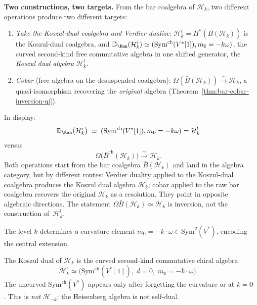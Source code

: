 \medskip
\noindent\textbf{Two constructions, two targets.}
From the bar coalgebra of $\mathcal{H}_k$, two different
operations produce two different targets:
\begin{enumerate}
\item \emph{Take the Koszul-dual coalgebra and Verdier dualize}:
$\mathcal H_k^i=H^*(\bar B(\mathcal H_k))$ is the
Koszul-dual coalgebra, and
$\mathbb{D}_{\Ran}(\mathcal H_k^i)
\simeq (\mathrm{Sym}^{\mathrm{ch}}(V^*[1]),m_0=-k\omega)$,
the curved second-kind free commutative algebra in one shifted
generator, the \emph{Koszul dual algebra} $\mathcal{H}_k^!$.
\item \emph{Cobar} (free algebra on the desuspended coalgebra):
$\Omega(\bar{B}(\mathcal{H}_k))
\xrightarrow{\sim} \mathcal{H}_k$,
a quasi-isomorphism recovering the \emph{original} algebra
(Theorem~\ref{thm:bar-cobar-inversion-qi}).
\end{enumerate}
In display:
\begin{equation}\label{eq:frame-koszul-dual-coalgebra-to-algebra}
\mathbb{D}_{\Ran}\!\left(\mathcal H_k^i\right)
\;\simeq\; (\mathrm{Sym}^{\mathrm{ch}}(V^*[1]),m_0=-k\omega)
= \mathcal{H}_k^!
\end{equation}
versus
\[
\Omega\bigl(\bar{B}^{\mathrm{ch}}(\mathcal{H}_k)\bigr)
\xrightarrow{\;\sim\;} \mathcal{H}_k.
\]
Both operations start from the bar coalgebra
$\bar{B}(\mathcal{H}_k)$ and land in the algebra category,
but by different routes: Verdier duality applied to the
Koszul-dual coalgebra produces the Koszul dual algebra
$\mathcal{H}_k^!$; cobar applied to the raw bar coalgebra
recovers the original $\mathcal{H}_k$ as a resolution. They
point in opposite algebraic directions. The statement
$\Omega\bar B(\mathcal H_k)\simeq\mathcal H_k$ is inversion,
not the construction of~$\mathcal H_k^!$.

The level $k$ determines a curvature element
$m_0 = -k \cdot \omega \in \mathrm{Sym}^2(V^*)$, encoding the
central extension.

\begin{theorem}
\label{thm:frame-heisenberg-koszul-dual}
The Koszul dual of $\mathcal{H}_k$ is the curved second-kind
commutative chiral algebra
\begin{equation}\label{eq:frame-koszul-dual}
\mathcal{H}_k^! \simeq \bigl(\mathrm{Sym}^{\mathrm{ch}}(V^*[1]),\;
d = 0,\; m_0 = -k \cdot \omega\bigr).
\end{equation}
The uncurved \(\mathrm{Sym}^{\mathrm{ch}}(V^*)\) appears only after
forgetting the curvature or at \(k=0\). This is \emph{not}
$\mathcal{H}_{-k}$: the Heisenberg algebra is not self-dual.
\end{theorem}

